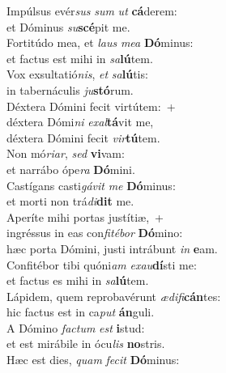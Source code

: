 \oddverse Impúlsus evér\textit{sus} \textit{sum} \textit{ut} \textbf{cá}derem:~\*\\
\oddverse et Dóminus \textit{su}\textbf{scé}pit me.\\
\evenverse Fortitúdo mea, et \textit{laus} \textit{me}\textit{a} \textbf{Dó}minus:~\*\\
\evenverse et factus est mihi in \textit{sa}\textbf{lú}tem.\\
\oddverse Vox exsultatió\textit{nis}, \textit{et} \textit{sa}\textbf{lú}tis:~\*\\
\oddverse in tabernáculis \textit{ju}\textbf{stó}rum.\\
\evenverse Déxtera Dómini fecit virtútem:~+\\
\evenverse  déxtera Dómi\textit{ni} \textit{e}\textit{xal}\textbf{tá}vit me,~\*\\
\evenverse déxtera Dómini fecit \textit{vir}\textbf{tú}tem.\\
\oddverse Non mó\textit{ri}\textit{ar}, \textit{sed} \textbf{vi}vam:~\*\\
\oddverse et narrábo ópe\textit{ra} \textbf{Dó}mini.\\
\evenverse Castígans casti\textit{gá}\textit{vit} \textit{me} \textbf{Dó}minus:~\*\\
\evenverse et morti non trá\textit{di}\textbf{dit} me.\\
\oddverse Aperíte mihi portas justítiæ,~+\\
\oddverse  ingréssus in eas con\textit{fi}\textit{té}\textit{bor} \textbf{Dó}mino:~\*\\
\oddverse hæc porta Dómini, justi intrábunt \textit{in} \textbf{e}am.\\
\evenverse Confitébor tibi quóni\textit{am} \textit{e}\textit{xau}\textbf{dí}sti me:~\*\\
\evenverse et factus es mihi in \textit{sa}\textbf{lú}tem.\\
\oddverse Lápidem, quem reprobavérunt \textit{æ}\textit{di}\textit{fi}\textbf{cán}tes:~\*\\
\oddverse hic factus est in ca\textit{put} \textbf{án}guli.\\
\evenverse A Dómino \textit{fa}\textit{ctum} \textit{est} \textbf{i}stud:~\*\\
\evenverse et est mirábile in ócu\textit{lis} \textbf{no}stris.\\
\oddverse Hæc est dies, \textit{quam} \textit{fe}\textit{cit} \textbf{Dó}minus:~\*\\
